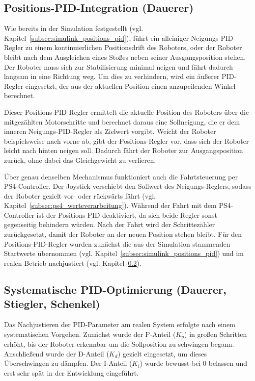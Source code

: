 \documentclass[fontsize=12pt,
parskip=half,	%
department=FakM,  %
logostyle=flat,
twoside, %
DIV=15,BCOR=10mm, %
]{OTHRreprt}
\begin{document}
\subsection{Positions-PID-Integration (Dauerer)}
\label{subsec:positions_pid_integration}

Wie bereits in der Simulation festgestellt (vgl. Kapitel~\ref{subsec:simulink_positions_pid}),
führt ein alleiniger Neigungs-PID-Regler zu einem kontinuierlichen Positionsdrift des Roboters,
oder der Roboter bleibt nach dem Ausgleichen eines Stoßes neben seiner Ausgangsposition stehen.
Der Roboter muss sich zur Stabilisierung minimal neigen und fährt dadurch langsam in eine
Richtung weg. Um dies zu verhindern, wird ein äußerer PID-Regler eingesetzt, der aus der aktuellen Position einen anzupeilenden Winkel berechnet.

Dieser Positions-PID-Regler ermittelt die aktuelle Position des
Roboters über die mitgezählten Motorschritte und berechnet daraus eine Sollneigung,
die er dem inneren Neigungs-PID-Regler als Zielwert vorgibt. Weicht der Roboter beispielsweise
nach vorne ab, gibt der Positions-Regler vor, dass sich der Roboter leicht nach
hinten neigen soll. Dadurch fährt der Roboter zur Ausgangsposition zurück, ohne
dabei das Gleichgewicht zu verlieren.

Über genau denselben Mechanismus funktioniert auch die Fahrtsteuerung per
PS4-Controller. Der Joystick verschiebt den Sollwert des Neigungs-Reglers, sodass der
Roboter gezielt vor- oder rückwärts fährt (vgl. Kapitel~\ref{subsec:ps4_werteverarbeitung}).
Während der Fahrt mit dem PS4-Controller ist der Positions-PID deaktiviert,
da sich beide Regler sonst gegenseitig behindern würden. Nach der Fahrt wird der
Schrittezähler zurückgesetzt, damit der Roboter an der neuen Position stehen bleibt.
Für den Positions-PID-Regler wurden zunächst die aus der Simulation stammenden
Startwerte übernommen (vgl. Kapitel~\ref{subsec:simulink_positions_pid}) und im realen Betrieb nachjustiert (vgl. Kapitel~\ref{subsec:pid_optimierung}).

\subsection{Systematische PID-Optimierung (Dauerer, Stiegler, Schenkel)}
\label{subsec:pid_optimierung}

Das Nachjustieren der PID-Parameter am realen System erfolgte nach einem systematischen Vorgehen. 
Zunächst wurde der P-Anteil ($K_p$) in großen Schritten erhöht, bis der Roboter erkennbar um die
Sollposition zu schwingen begann. Anschließend wurde der D-Anteil ($K_d$) gezielt eingesetzt,
um dieses Überschwingen zu dämpfen. Der I-Anteil ($K_i$) wurde bewusst bei 0 belassen und erst
sehr spät in der Entwicklung eingeführt.
\end{document}
